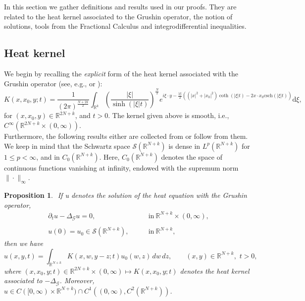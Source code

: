 \documentclass[a4,psfig,english,12pt,epsf,portrait]{article}
\newtheorem{proposition}[theorem]{Proposition}
\numberwithin{equation}{section}
\def\R{{\mathbb {R}}}
\def\R{\mathbb{R}}
\begin{document}
In this section we gather definitions and results used in our proofs. They are related to the heat kernel associated to the Grushin operator, the notion of solutions, tools from the Fractional Calculus and integrodifferential inequalities.

\subsection{Heat kernel}


We begin by recalling the \textit{explicit} form of the heat kernel associated with the Grushin operator (see, e.g., \cite[Proposition~2.5]{Oli-Vi-23} or \cite{Garofalo-Trallli-22}):
\begin{equation}\label{HK}
	K(x, x_0,y;t) = \frac{1}{(2\pi)^{\frac{N+2k}{2}}} \int_{\R^k} \left(\frac{|\xi|}{\sinh(|\xi| t)}\right)^{\frac{N}{2}} e^{i\xi  \cdot y- \frac{|\xi|}{2}\left((|x|^2 + |x_0|^2)  \coth(|\xi| t) -2x\cdot x_0 \mathrm{csch}(|\xi|t) \right)} \mathrm{d}\xi, 
\end{equation}
for $(x, x_0,y) \in \R^{2N+k}$, and  $t>0$. The kernel given above is smooth, i.e., $C^\infty(\R^{2N+k}\times(0,\infty))$.\\
Furthermore, the following results either are collected from \cite{Bi-Bra-23,Kogoj-Lima-Viana-24, Oli-Vi-23} or follow from them. We keep in mind that the Schwartz space $\mathcal{S}(\R^{N+k})$ is dense in $L^p(\mathbb{R}^{N+k})$ for $1\leq p< \infty$, and in $C_0(\mathbb{R}^{N+k})$. Here, $C_0(\R^{N+k})$ denotes the space of continuous functions vanishing at infinity, endowed with the supremum norm $\|\cdotp\|_\infty$.\\


\begin{proposition}\label{Heat}${}$
	If u denotes the solution of the heat equation with the Grushin operator,
	\begin{equation}\label{cauchy}
		\begin{array}{ll}
			\partial_{t}u-\Delta_{\mathcal{G}}u=0,&\qquad \mathrm{in}\  \R^{N+k}\times (0,\infty),
			\\{}\\ u(0)=u_0\in \mathcal{S}(\R^{N+k}),&\qquad \mathrm{in}\  \R^{N+k},
		\end{array}
	\end{equation}
	then we have
	\begin{equation}\label{solinear}
		u(x,y,t)=	\int_{\R^{N+k}} K(x,w,y-z;t) u_0(w,z)\,dw\,dz,\qquad (x,y)\in \R^{N+k},\,\,t>0,
	\end{equation} 
	where $(x, x_0,y;t)\in\R^{2N+k}\times(0,\infty)\mapsto K(x, x_0,y;t) $ denotes the heat kernel associated to $-\Delta_{\mathcal{G}}$. Moreover, $u\in C([0,\infty)\times\R^{N+k})\cap C^1((0,\infty),C^2(\R^{N+k}))$.
\end{proposition} 
\end{document}
